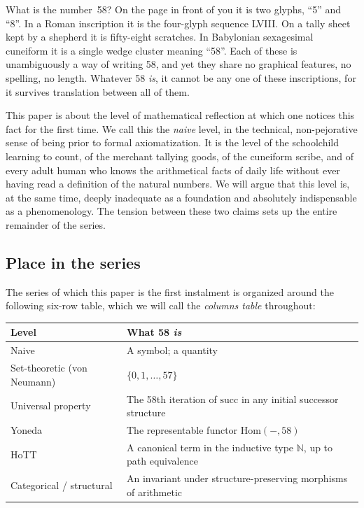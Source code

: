 \documentclass[12pt]{article}
\theoremstyle{definition}
\theoremstyle{remark}
\begin{document}
What is the number~58? On the page in front of you it is two glyphs, ``5''
and ``8''. In a Roman inscription it is the four-glyph sequence
\textsf{LVIII}. On a tally sheet kept by a shepherd it is fifty-eight scratches.
In Babylonian sexagesimal cuneiform it is a single wedge cluster meaning
``58''. Each of these is unambiguously a way of writing 58, and yet they share
no graphical features, no spelling, no length. Whatever 58 \emph{is}, it
cannot be any one of these inscriptions, for it survives translation between
all of them.

This paper is about the level of mathematical reflection at which one notices
this fact for the first time. We call this the \emph{naive} level, in the
technical, non-pejorative sense of being prior to formal axiomatization. It
is the level of the schoolchild learning to count, of the merchant tallying
goods, of the cuneiform scribe, and of every adult human who knows the
arithmetical facts of daily life without ever having read a definition of
the natural numbers. We will argue that this level is, at the same time,
deeply inadequate as a foundation and absolutely indispensable as a
phenomenology. The tension between these two claims sets up the entire
remainder of the series.

\subsection{Place in the series}

The series of which this paper is the first instalment is organized around
the following six-row table, which we will call the \emph{columns table}
throughout:

\begin{center}
\begin{tabularx}{\textwidth}{l|X}
\textbf{Level} & \textbf{What 58 \emph{is}} \\ \hline
Naive & A symbol; a quantity \\
Set-theoretic (von Neumann) & $\{0, 1, \ldots, 57\}$ \\
Universal property & The 58th iteration of $\mathrm{succ}$ in any initial successor structure \\
Yoneda & The representable functor $\mathrm{Hom}(-, 58)$ \\
HoTT & A canonical term in the inductive type $\mathbb{N}$, up to path equivalence \\
Categorical / structural & An invariant under structure-preserving morphisms of arithmetic \\
\end{tabularx}
\end{center}
\end{document}
